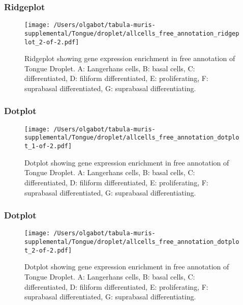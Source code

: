 \clearpage
\clearpage
\subsubsection{Ridgeplot}
\begin{figure}[h]
\centering
\texttt{[image: /Users/olgabot/tabula-muris-supplemental/Tongue/droplet/allcells\_free\_annotation\_ridgeplot\_2-of-2.pdf]}

\caption{ Ridgeplot  showing gene expression enrichment in free annotation of Tongue Droplet. A: Langerhans cells, B: basal cells, C: differentiated, D: filiform differentiated, E: proliferating, F: suprabasal differentiated, G: suprabasal differentiating.}
\end{figure}


\clearpage
\clearpage
\subsubsection{Dotplot}
\begin{figure}[h]
\centering
\texttt{[image: /Users/olgabot/tabula-muris-supplemental/Tongue/droplet/allcells\_free\_annotation\_dotplot\_1-of-2.pdf]}

\caption{ Dotplot  showing gene expression enrichment in free annotation of Tongue Droplet. A: Langerhans cells, B: basal cells, C: differentiated, D: filiform differentiated, E: proliferating, F: suprabasal differentiated, G: suprabasal differentiating.}
\end{figure}


\clearpage
\clearpage
\subsubsection{Dotplot}
\begin{figure}[h]
\centering
\texttt{[image: /Users/olgabot/tabula-muris-supplemental/Tongue/droplet/allcells\_free\_annotation\_dotplot\_2-of-2.pdf]}

\caption{ Dotplot  showing gene expression enrichment in free annotation of Tongue Droplet. A: Langerhans cells, B: basal cells, C: differentiated, D: filiform differentiated, E: proliferating, F: suprabasal differentiated, G: suprabasal differentiating.}
\end{figure}

